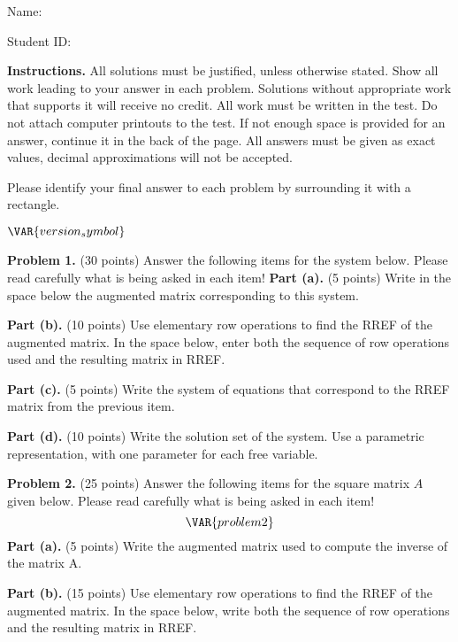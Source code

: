 \documentclass[12pt]{article}
\begin{document}
Name: \hrulefill

\bigskip
Student ID: \hrulefill

\bigskip
\textbf{Instructions.} All solutions must be justified, unless otherwise stated. Show all work leading to your answer in each problem. Solutions without appropriate work that supports it will receive no credit. All work must be written in the test. Do not attach computer printouts to the test. If not enough space is provided for an answer, continue it in the back of the page. All answers must be given as exact values, decimal approximations will not be accepted.

Please identify your final answer to each problem by surrounding it with a rectangle.

\vfill
\hfill$\VAR{version_symbol}$

\clearpage

\textbf{Problem 1.} (30 points)
Answer the following items for the system below. Please read carefully what is being asked in each item!
\textbf{Part (a).} (5 points) Write in the space below the augmented matrix corresponding to this system.

\vskip1.5in

\textbf{Part (b).} (10 points) Use elementary row operations to find the RREF of the augmented matrix. In the space below, enter both the sequence of row operations used and the resulting matrix in RREF.

\clearpage

\textbf{Part (c).} (5 points) Write the system of equations that correspond to the RREF matrix from the previous item.

\vskip3in

\textbf{Part (d).} (10 points) Write the solution set of the system. Use a parametric representation, with one parameter for each free variable.

\clearpage


\textbf{Problem 2.} (25 points) Answer the following items for the square matrix $A$ given below. Please read carefully what is being asked in each item!
\[
\VAR{problem2}
\]
\textbf{Part (a).} (5 points) Write the augmented matrix used to compute the inverse of the matrix A.

\vskip1in

\textbf{Part (b).} (15 points) Use elementary row operations to find the RREF of the augmented matrix.
In the space below, write both the sequence of row operations and the resulting matrix in RREF.
\end{document}
